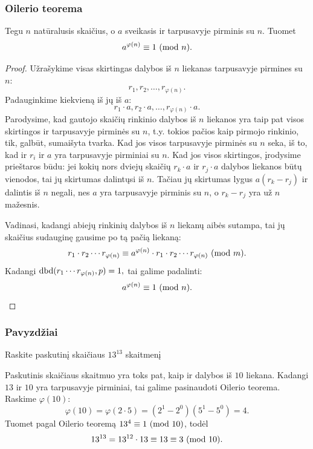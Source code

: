 \subsubsection{Oilerio teorema}

\begin{thm}
  Tegu $n$ natūralusis skaičius, o $a$ sveikasis ir tarpusavyje pirminis su
  $n$. Tuomet 
  $$a^{\varphi(n)} \equiv 1 \ (\text{mod } n).$$
\end{thm}

\begin{proof}
  Užrašykime visas skirtingas dalybos iš $n$ liekanas tarpusavyje pirmines
  su $n$:
  $$r_1, r_2, \dots, r_{\varphi(n)}.$$
  Padauginkime kiekvieną iš jų iš $a$:
  $$r_1\cdot a, r_2\cdot a, \dots, r_{\varphi(n)}\cdot a.$$
  Parodysime, kad gautojo skaičių rinkinio dalybos iš $n$ liekanos yra taip
  pat visos skirtingos ir tarpusavyje pirminės su $n$, t.y. tokios pačios
  kaip pirmojo rinkinio, tik, galbūt, sumaišyta tvarka. Kad jos visos tarpusavyje
  pirminės su  $n$ seka, iš to, kad ir $r_i$ ir $a$ yra tarpusavyje
  pirminiai su $n$. Kad jos visos skirtingos, įrodysime prieštaros būdu: jei kokių
  nors dviejų skaičių
  $r_k\cdot a$ ir $r_j\cdot a$ dalybos liekanos būtų vienodos, tai jų skirtumas dalintųsi iš
  $n$. Tačiau jų skirtumas lygus $a(r_k-r_j)$ ir dalintis iš $n$ negali, nes
  $a$ yra tarpusavyje pirminis su $n$, o $r_k-r_j$ yra už $n$ mažesnis. 

  Vadinasi, kadangi abiejų rinkinių dalybos iš $n$ liekanų aibės sutampa,
  tai jų skaičius sudauginę gausime po tą pačią liekaną:
  $$r_1\cdot r_2 \cdots r_{\varphi(n)} \equiv a^{\varphi(n)} \cdot r_1
  \cdot r_2 \cdots r_{\varphi(n)} \ (\text{mod } m).$$
  Kadangi $\operatorname{dbd}(r_1\cdots r_{\varphi(n)} , p)=1,$ tai galime padalinti:
  $$a^{\varphi(n)}\equiv 1 \ (\text{mod } n).$$
\end{proof}

\subsubsection{Pavyzdžiai}

\begin{pavnr} 
  Raskite paskutinį skaičiaus $13^{13}$ skaitmenį
\end{pavnr}

\begin{sprendimas}
Paskutinis skaičiaus skaitmuo yra toks pat, kaip ir dalybos iš $10$
liekana. Kadangi $13$ ir $10$ yra tarpusavyje pirminiai, tai galime
pasinaudoti Oilerio teorema. Raskime $\varphi(10)$:
$$\varphi(10) = \varphi(2\cdot 5) = (2^1 - 2^0)(5^1 - 5^0) = 4.$$
Tuomet pagal Oilerio teoremą $13^4 \equiv 1\ (\text{mod } 10)$, todėl 
$$13^{13} = 13^{12} \cdot 13 \equiv 13 \equiv 3 \ (\text{mod } 10).$$
\end{sprendimas}

